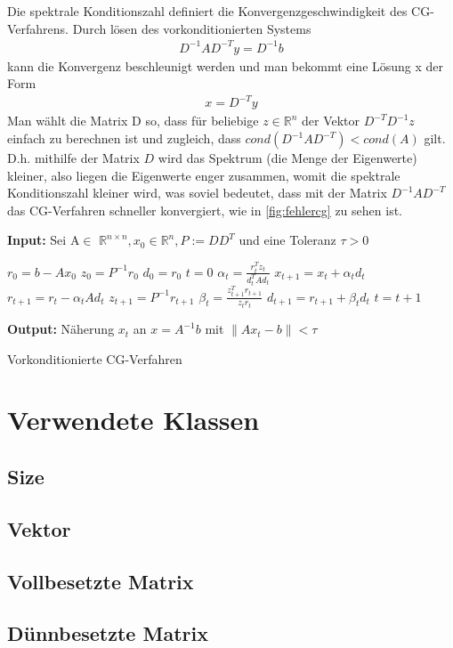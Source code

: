 \documentclass[12pt,a4paper]{scrartcl}
\numberwithin{equation}{section}
\numberwithin{myalgctr}{section}
\numberwithin{mytheoremctr}{subsection}
\numberwithin{mykorollarctr}{subsection}
\numberwithin{mylemmactr}{subsection}
\numberwithin{mybeispielctr}{subsection}
\newcommand\norm[1]{\left\lVert#1\right\rVert}
\begin{document}
	
	Die spektrale Konditionszahl definiert die Konvergenzgeschwindigkeit des CG-Verfahrens. Durch lösen des vorkonditionierten Systems
	\begin{align*}
		D^{-1}AD^{-T}y = D^{-1}b
	\end{align*}
	kann die Konvergenz beschleunigt werden und man bekommt eine Lösung x der Form 
	\begin{align*}
		x = D^{-T}y
	\end{align*}
	Man wählt die Matrix D so, dass für beliebige $z \in \mathbb{R}^{n}$ der Vektor $D^{-T}D^{-1}z$ einfach zu berechnen ist und zugleich, dass $cond(D^{-1}AD^{-T}) < cond(A)$ gilt. D.h. mithilfe der Matrix $D$ wird das Spektrum (die Menge der Eigenwerte) kleiner, also liegen die Eigenwerte enger zusammen, womit die spektrale Konditionszahl kleiner wird, was soviel bedeutet, dass mit der Matrix $D^{-1}AD^{-T}$ das CG-Verfahren schneller konvergiert, wie in \cref{fig:fehlercg} zu sehen ist. 
	\begin{algorithm}[H]
		\textbf{Input:} Sei A$\in$ $\mathbb{R}^{n\times n}, x_0 \in \mathbb{R}^{n}, P:=DD^{T}$ und eine Toleranz $\tau > 0$
		\begin{algorithmic}[1]
			\State $r_0 = b - Ax_0$
			\State $z_0 = P^{-1}r_0$
			\State $d_0 = r_0$
			\State $t = 0$
			\While{$ \norm{r_t} > \tau $}
			\State $\alpha_t = \frac{r_t^{T}z_t}{d_t^{T}Ad_t}$
			\State $x_{t+1} = x_{t} + \alpha_t d_t$
			\State $r_{t+1} = r_t - \alpha_t Ad_t$
			\State $z_{t+1} = P^{-1}r_{t+1}$
			\State $\beta_t = \frac{z_{t+1}^{T}r_{t+1}}{z_tr_t}$
			\State $d_{t+1} = r_{t+1} + \beta_td_t$
			\State $t = t + 1$
			\EndWhile
		\end{algorithmic}
		\textbf{Output:} Näherung $x_t$ an $x = A^{-1}b$ mit $\norm{Ax_t-b} < \tau$
		
		\caption{Vorkonditionierte CG-Verfahren} \label{alg:vcg}
	\end{algorithm}
	
	\newpage
	\appendix
	\section{Verwendete Klassen}
	\subsection{Size}
	
	\subsection{Vektor}
	
	\subsection{Vollbesetzte Matrix}
	
	\subsection{D\"unnbesetzte Matrix}
	
	
	\newpage
	\printbibliography
	\lstlistoflistings
	\listoffigures
	\thispagestyle{firststyle}
	
\end{document}
